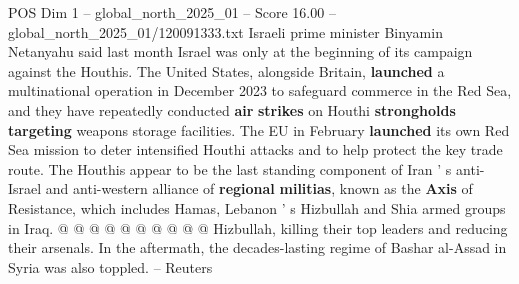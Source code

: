 \begin{textsample}{POS Dim 1 – global\_north\_2025\_01 – Score 16.00 – global\_north\_2025\_01/120091333.txt}
Israeli prime minister Binyamin Netanyahu said last month Israel was only at the beginning of its campaign against the Houthis.
The United States, alongside Britain, \textbf{launched} a multinational operation in December 2023 to safeguard commerce in the Red Sea, and they have repeatedly conducted \textbf{air} \textbf{strikes} on Houthi \textbf{strongholds} \textbf{targeting} weapons storage facilities.
The EU in February \textbf{launched} its own Red Sea mission to deter intensified Houthi attacks and to help protect the key trade route.
The Houthis appear to be the last standing component of Iran ' s anti-Israel and anti-western alliance of \textbf{regional} \textbf{militias}, known as the \textbf{Axis} of Resistance, which includes Hamas, Lebanon ' s Hizbullah and Shia armed groups in Iraq. @ @ @ @ @ @ @ @ @ @ Hizbullah, killing their top leaders and reducing their arsenals.
In the aftermath, the decades-lasting regime of Bashar al-Assad in Syria was also toppled. -- Reuters

\end{textsample}
